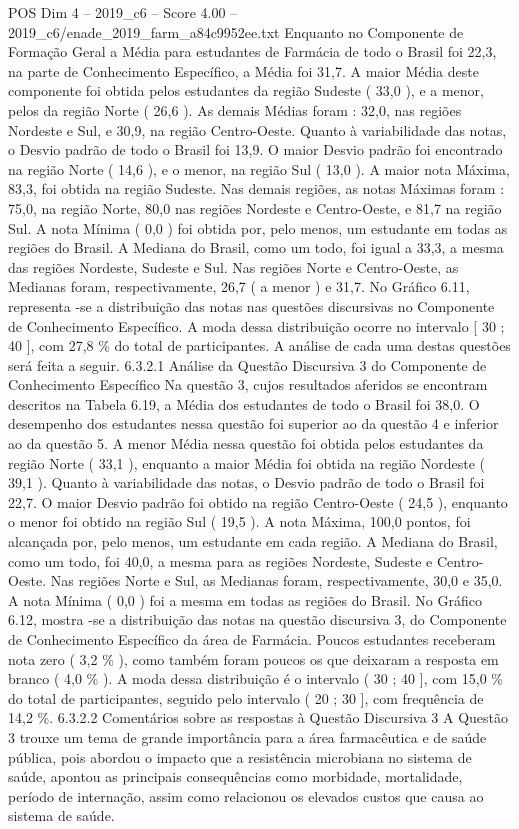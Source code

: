 \begin{textsample}{POS Dim 4 – 2019\_c6 – Score 4.00 – 2019\_c6/enade\_2019\_farm\_a84c9952ee.txt}
Enquanto no Componente de Formação Geral a Média para estudantes de Farmácia de todo o Brasil foi 22,3, na parte de Conhecimento Específico, a Média foi 31,7.
A maior Média deste componente foi obtida pelos estudantes da região Sudeste ( 33,0 ), e a menor, pelos da região Norte ( 26,6 ).
As demais Médias foram : 32,0, nas regiões Nordeste e Sul, e 30,9, na região Centro-Oeste.
Quanto à variabilidade das notas, o Desvio padrão de todo o Brasil foi 13,9.
O maior Desvio padrão foi encontrado na região Norte ( 14,6 ), e o menor, na região Sul ( 13,0 ).
A maior nota Máxima, 83,3, foi obtida na região Sudeste.
Nas demais regiões, as notas Máximas foram : 75,0, na região Norte, 80,0 nas regiões Nordeste e Centro-Oeste, e 81,7 na região Sul.
A nota Mínima ( 0,0 ) foi obtida por, pelo menos, um estudante em todas as regiões do Brasil.
A Mediana do Brasil, como um todo, foi igual a 33,3, a mesma das regiões Nordeste, Sudeste e Sul.
Nas regiões Norte e Centro-Oeste, as Medianas foram, respectivamente, 26,7 ( a menor ) e 31,7.
No Gráfico 6.11, representa -se a distribuição das notas nas questões discursivas no Componente de Conhecimento Específico.
A moda dessa distribuição ocorre no intervalo [ 30 ; 40 ], com 27,8 \% do total de participantes.
A análise de cada uma destas questões será feita a seguir. 6.3.2.1 Análise da Questão Discursiva 3 do Componente de Conhecimento Específico Na questão 3, cujos resultados aferidos se encontram descritos na Tabela 6.19, a Média dos estudantes de todo o Brasil foi 38,0.
O desempenho dos estudantes nessa questão foi superior ao da questão 4 e inferior ao da questão 5.
A menor Média nessa questão foi obtida pelos estudantes da região Norte ( 33,1 ), enquanto a maior Média foi obtida na região Nordeste ( 39,1 ).
Quanto à variabilidade das notas, o Desvio padrão de todo o Brasil foi 22,7.
O maior Desvio padrão foi obtido na região Centro-Oeste ( 24,5 ), enquanto o menor foi obtido na região Sul ( 19,5 ).
A nota Máxima, 100,0 pontos, foi alcançada por, pelo menos, um estudante em cada região.
A Mediana do Brasil, como um todo, foi 40,0, a mesma para as regiões Nordeste, Sudeste e Centro-Oeste.
Nas regiões Norte e Sul, as Medianas foram, respectivamente, 30,0 e 35,0.
A nota Mínima ( 0,0 ) foi a mesma em todas as regiões do Brasil.
No Gráfico 6.12, mostra -se a distribuição das notas na questão discursiva 3, do Componente de Conhecimento Específico da área de Farmácia.
Poucos estudantes receberam nota zero ( 3,2 \% ), como também foram poucos os que deixaram a resposta em branco ( 4,0 \% ).
A moda dessa distribuição é o intervalo ( 30 ; 40 ], com 15,0 \% do total de participantes, seguido pelo intervalo ( 20 ; 30 ], com frequência de 14,2 \%. 6.3.2.2 Comentários sobre as respostas à Questão Discursiva 3 A Questão 3 trouxe um tema de grande importância para a área farmacêutica e de saúde pública, pois abordou o impacto que a resistência microbiana no sistema de saúde, apontou as principais consequências como morbidade, mortalidade, período de internação, assim como relacionou os elevados custos que causa ao sistema de saúde.

\end{textsample}
